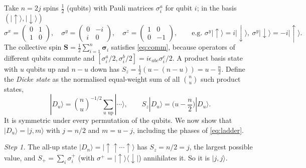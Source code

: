 \documentclass[11pt,a4paper]{article}
\newcommand{\vS}{\bm{S}}
\newcommand{\up}{{\uparrow}}
\newcommand{\dn}{{\downarrow}}
\begin{document}
Take $n = 2j$ spins $\frac12$ (qubits) with Pauli matrices $\sigma^a_i$ for qubit $i$; in the basis $(|\up\rangle,
|\dn\rangle)$
\begin{equation}\label{eq:pauli}
  \sigma^x = \begin{pmatrix}0&1\\1&0\end{pmatrix},\quad
  \sigma^y = \begin{pmatrix}0&-i\\i&0\end{pmatrix},\quad
  \sigma^z = \begin{pmatrix}1&0\\0&-1\end{pmatrix},
  \qquad\text{e.g. } \sigma^y|\up\rangle = i|\dn\rangle,\ \sigma^y|\dn\rangle = -i|\up\rangle .
\end{equation}
The collective spin $\vS = \frac12\sum_{i=1}^{n}\bm\sigma_i$ satisfies \eqref{eq:comm}, because operators of different
qubits commute and $[\sigma^a_i/2,\sigma^b_i/2] = i\epsilon_{abc}\sigma^c_i/2$.
A product basis state with $u$ qubits up and $n-u$ down has $S_z = \frac12(u - (n-u)) = u - \frac n2$. Define the
\emph{Dicke state} as the normalised equal-weight sum of all $\binom{n}{u}$ such product states,
\begin{equation}\label{eq:dicke-abstract}
  |D_u\rangle = \binom{n}{u}^{-1/2}\sum_{\text{$u$ up}}|\cdots\rangle ,\qquad S_z|D_u\rangle = \Big(u-\frac n2\Big)|D_u\rangle .
\end{equation}
It is symmetric under every permutation of the qubits. We now show that $|D_u\rangle = |j,m\rangle$ with $j = n/2$ and
$m = u - j$, including the phases of \eqref{eq:ladder}.

\emph{Step 1.} The all-up state $|D_n\rangle = |\up\up\cdots\up\rangle$ has $S_z = n/2 = j$, the largest possible
value, and $S_+ = \sum_i\sigma^+_i$ (with $\sigma^+ = |\up\rangle\langle\dn|$) annihilates it. So it is $|j,j\rangle$.
\end{document}
